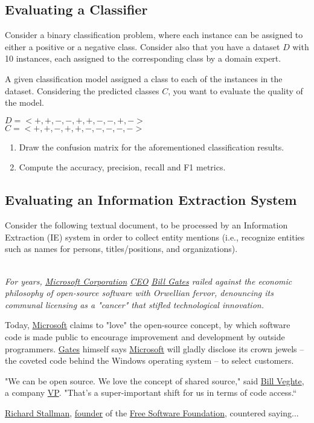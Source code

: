\documentclass[12pt]{article}
\begin{document}
\subsection{Evaluating a Classifier}

Consider a binary classification problem, where each instance can be assigned to either a positive or a negative class. Consider also that you have a dataset $D$ with 10 instances, each assigned to the corresponding class by a domain expert. 

A given classification model assigned a class to each of the instances in the dataset. Considering the predicted classes $C$, you want to evaluate the quality of the model.

\begin{center}
$D = < + , + , - , - , + , + , - , - , + , - >$ \\
$C = < + , + , - , + , + , - , - , - , - , - >$
\end{center}

\begin{enumerate}
\item Draw the confusion matrix for the aforementioned classification results.
\item Compute the accuracy, precision, recall and F1 metrics.
\end{enumerate}

\subsection{Evaluating an Information Extraction System}

Consider the following textual document, to be processed by an Information Extraction (IE) system in order to collect entity mentions (i.e., recognize entities such as names for persons, titles/positions, and organizations).

{\it 
~\\
For years, \underline{Microsoft Corporation} \underline{CEO} \underline{Bill Gates} railed against the economic philosophy of open-source software with Orwellian fervor, denouncing its communal licensing as a "cancer" that stifled technological innovation.

Today, \underline{Microsoft} claims to "love" the open-source concept, by which software code is made public to encourage improvement and development by outside programmers. \underline{Gates} himself says \underline{Microsoft} will gladly disclose its crown jewels -- the coveted code behind the Windows operating system -- to select customers.

"We can be open source. We love the concept of shared source," said \underline{Bill Veghte}, a company \underline{VP}. "That's a super-important shift for us in terms of code access.“

\underline{Richard Stallman}, \underline{founder} of the \underline{Free Software Foundation}, countered saying...
~\\
}
\end{document}
